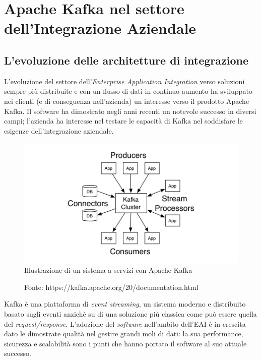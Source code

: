 \chapter{Apache Kafka nel settore dell’Integrazione Aziendale}

\section{L’evoluzione delle architetture di integrazione}

L'evoluzione del settore dell'\textit{Enterprise Application Integration} verso soluzioni sempre più distribuite e con un flusso di dati in continuo aumento ha sviluppato nei clienti (e di conseguenza nell'azienda) un interesse verso il prodotto Apache Kafka.
Il software ha dimostrato negli anni recenti un notevole successo in diversi campi; l'azienda ha interesse nel testare le capacità di Kafka nel soddisfare le esigenze dell'integrazione aziendale.

\bigskip
\begin{figure}[h]
  \includegraphics[width=\textwidth]{images/kafka.png}\\
  \caption{Illustrazione di un sistema a servizi con Apache Kafka}
  \captionsetup{aboveskip=2pt,font=it}
  \caption*{Fonte: https://kafka.apache.org/20/documentation.html}
\end{figure}

Kafka è una piattaforma di \textit{event streaming}, un sistema moderno e distribuito basato sugli eventi anzichè su di una soluzione più classica come può essere quella del \textit{request/response}.
L'adozione del \textit{software} nell'ambito dell'EAI è in crescita dato le dimostrate qualità nel gestire grandi moli di dati: la sua performance, sicurezza e scalabilità sono i punti che hanno portato il software al suo attuale successo.

